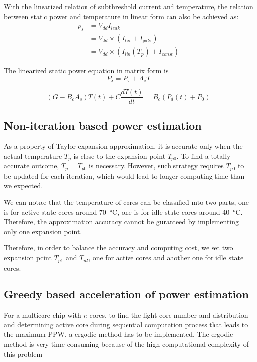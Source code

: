 With the linearized relation of subthreshold current and temperature, the relation between static power and temperature in linear form can also be achieved as:
\begin{equation}\label{linear_static}
\begin{split}
p_{s} &= V_{dd}I_{leak}\\
&= V_{dd} \times (I_{lin}+I_{gate})\\
&= V_{dd} \times (I_{lin}(T_{p})+I_{const})
\end{split}
\end{equation}


The linearized static power equation in matrix form is
\begin{equation}\label{linear_static_matrix}
P_{s} = P_{0}+A_{s}T
\end{equation}

\begin{equation}\label{gt=bp}
(G - B_{c}A_{s})T(t) + C\frac{dT(t)}{dt} = B_{c}(P_{d}(t) + P_{0})
\end{equation}

\subsection{Non-iteration based power estimation}
As a property of Taylor expansion approximation, it is accurate only when the actual temperature $T_{p}$ is close to the expansion point $T_{p0}$. To find a totally accurate outcome, $T_{p} = T_{p0}$ is necessary. However, such strategy requires $T_{p0}$ to be updated for each iteration, which would lead to longer computing time than we expected. 

We can notice that the temperature of cores can be classified into two parts, one is for active-state cores around \SI{70}{\degreeCelsius}, one is for idle-state cores around \SI{40}{\degreeCelsius}. Therefore, the approximation accuracy cannot be guranteed by implementing only one expansion point. 

Therefore, in order to balance the accuracy and computing cost, we set two expansion point $T_{p1}$ and $T_{p2}$, one for active cores and another one for idle state cores.


\subsection{Greedy based acceleration of power estimation}
For a multicore chip with $n$ cores, to find the light core number and distribution and determining active core during sequential computation process that leads to the maximum PPW, a ergodic method has to be implemented. The ergodic method is very time-consuming because of the high computational complexity of this problem. 

